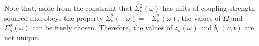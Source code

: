 Note that, aside from the constraint that $\Sigma_\sigma^2(\omega)$ has units of coupling strength squared and obeys the property $\Sigma_\sigma^2(-\omega) = -\Sigma_\sigma^2(\omega)$, the values of $\Omega$ and $\Sigma_\sigma^2(\omega)$ can be freely chosen. Therefore, the values of $z_\sigma(\omega)$ and $\hat{b}_\sigma(\nu,t)$ are not unique.















